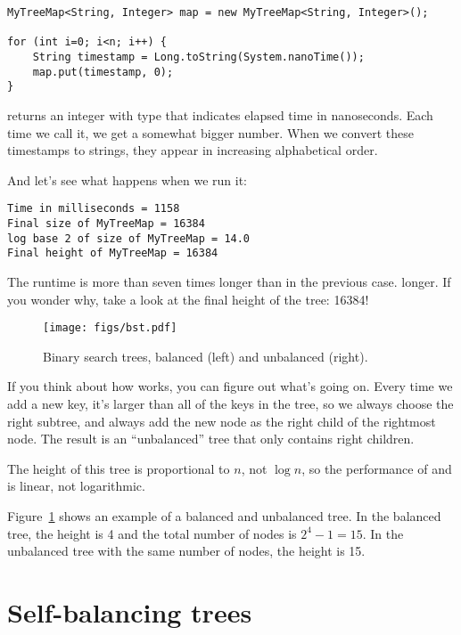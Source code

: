 \documentclass[12pt]{book}
\theoremstyle{exercise}
\begin{document}
\begin{verbatim}
MyTreeMap<String, Integer> map = new MyTreeMap<String, Integer>();

for (int i=0; i<n; i++) {
    String timestamp = Long.toString(System.nanoTime());
    map.put(timestamp, 0);
}
\end{verbatim}

 returns an integer with type  that
indicates elapsed time in nanoseconds. Each time we call it, we get a
somewhat bigger number. When we convert these timestamps to strings,
they appear in increasing alphabetical order.

And let's see what happens when we run it:

\begin{verbatim}
Time in milliseconds = 1158
Final size of MyTreeMap = 16384
log base 2 of size of MyTreeMap = 14.0
Final height of MyTreeMap = 16384
\end{verbatim}

The runtime is more than seven times longer than in the previous case.
longer. If you wonder why, take a look at the final height of the tree:
16384!

\begin{figure}
\centering
\texttt{[image: figs/bst.pdf]}
\caption{Binary search trees, balanced (left) and unbalanced (right).}
\label{bstfig}
\end{figure}

If you think about how  works, you can figure out what's
going on. Every time we add a new key, it's larger than all of the keys
in the tree, so we always choose the right subtree, and always add the
new node as the right child of the rightmost node. The result is an
``unbalanced'' tree that only contains right children.


The height of this tree is proportional to $n$, not
$\log n$, so the performance of  and  is
linear, not logarithmic.


Figure~\ref{bstfig} shows an example of a balanced and unbalanced
tree.  In the balanced tree, the height is 4 and the total number of
nodes is $2^4-1 = 15$.  In the unbalanced tree with the same number of
nodes, the height is 15.


\section{Self-balancing trees}
\label{self-balancing-trees}
\end{document}
